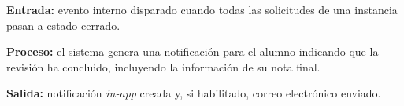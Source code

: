 \begin{functional}
    \textbf{Entrada:} evento interno disparado cuando todas las solicitudes de una instancia
    pasan a estado cerrado.

    \textbf{Proceso:} el sistema genera una notificación para el alumno indicando que la
    revisión ha concluido, incluyendo la información de su nota final.

    \textbf{Salida:} notificación \textit{in-app} creada y, si habilitado, correo
    electrónico enviado.

\end{functional}

